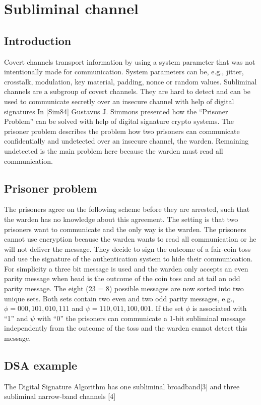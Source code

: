 \documentclass{article}
\begin{document}
\section{Subliminal channel}
\subsection{Introduction}
Covert channels transport information by using a system parameter that was not intentionally made for communication. System parameters can be, e.g., jitter, crosstalk, modulation, key material, padding, nonce or random values. Subliminal channels are a subgroup of covert channels. They are hard to detect and can be used to communicate secretly over an insecure channel with help of digital signatures
In [Sim84] Gustavus J. Simmons presented how the “Prisoner Problem” can be solved with help of digital signature crypto systems. The prisoner problem describes the problem how two prisoners can communicate confidentially and undetected over an insecure channel, the warden. Remaining undetected is the main problem here because the warden must read all communication.
\subsection{Prisoner problem}
The prisoners agree on the following scheme before they are arrested, such that the warden has no knowledge about this agreement. The setting is that two prisoners want to communicate and the only way is the warden. The prisoners cannot use encryption because the warden wants to read all communication or he will not deliver the message. They decide to sign the outcome of a fair-coin toss and use the signature of the authentication system to hide their communication.
For simplicity a three bit message is used and the warden only accepts an even parity message when head is the outcome of the coin toss and at tail an odd parity message. The eight (23 = 8) possible messages are now sorted into two unique sets. Both sets contain two even and two odd parity messages, e.g., $\phi = {000, 101, 010, 111}$ and $\psi = {110, 011, 100, 001}$.
If the set $\phi$ is associated with “1” and $\psi$ with “0” the prisoners can communicate a 1-bit subliminal message independently from the outcome of the toss and the warden cannot detect this message.
\subsection{DSA example}
The Digital Signature Algorithm has one subliminal broadband[3] and three subliminal narrow-band channels [4]
\end{document}
